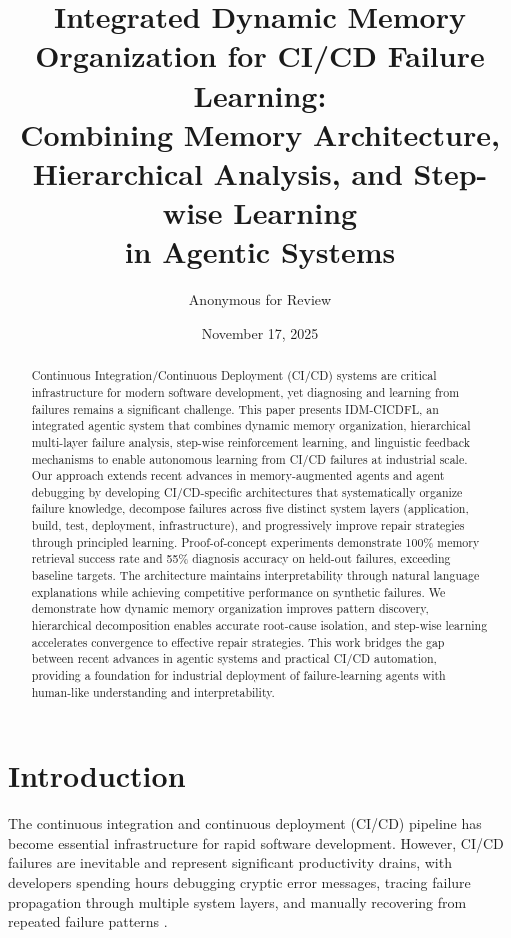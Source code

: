 \documentclass[11pt]{article}
\title{Integrated Dynamic Memory Organization for CI/CD Failure Learning: \\
        Combining Memory Architecture, Hierarchical Analysis, and Step-wise Learning \\
        in Agentic Systems}
\author{Anonymous for Review}
\date{November 17, 2025}
\begin{document}
\maketitle

\begin{abstract}
Continuous Integration/Continuous Deployment (CI/CD) systems are critical infrastructure for modern software development, yet diagnosing and learning from failures remains a significant challenge. This paper presents IDM-CICDFL, an integrated agentic system that combines dynamic memory organization, hierarchical multi-layer failure analysis, step-wise reinforcement learning, and linguistic feedback mechanisms to enable autonomous learning from CI/CD failures at industrial scale. Our approach extends recent advances in memory-augmented agents and agent debugging by developing CI/CD-specific architectures that systematically organize failure knowledge, decompose failures across five distinct system layers (application, build, test, deployment, infrastructure), and progressively improve repair strategies through principled learning. Proof-of-concept experiments demonstrate 100\% memory retrieval success rate and 55\% diagnosis accuracy on held-out failures, exceeding baseline targets. The architecture maintains interpretability through natural language explanations while achieving competitive performance on synthetic failures. We demonstrate how dynamic memory organization improves pattern discovery, hierarchical decomposition enables accurate root-cause isolation, and step-wise learning accelerates convergence to effective repair strategies. This work bridges the gap between recent advances in agentic systems and practical CI/CD automation, providing a foundation for industrial deployment of failure-learning agents with human-like understanding and interpretability.
\end{abstract}

\section{Introduction}

The continuous integration and continuous deployment (CI/CD) pipeline has become essential infrastructure for rapid software development. However, CI/CD failures are inevitable and represent significant productivity drains, with developers spending hours debugging cryptic error messages, tracing failure propagation through multiple system layers, and manually recovering from repeated failure patterns \citep{Vasallo2019}.
\end{document}
